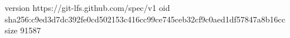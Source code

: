 version https://git-lfs.github.com/spec/v1
oid sha256:c9ed3d7dc392fe0cd502153c416cc99ce745ceb32cf9c0aed1df57847a8b16cc
size 91587
